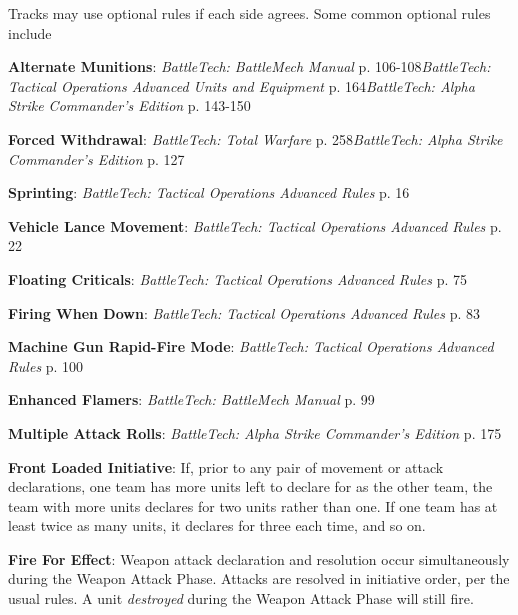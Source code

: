 Tracks may use optional rules if each side agrees.
Some common optional rules include

\begin{description}

  \item {\bfseries Alternate Munitions}: \emph{BattleTech: BattleMech Manual} p. 106-108\emph{BattleTech: Tactical Operations Advanced Units and Equipment} p. 164\emph{BattleTech: Alpha Strike Commander's Edition} p. 143-150

  \item {\bfseries Forced Withdrawal}: \emph{BattleTech: Total Warfare} p. 258\emph{BattleTech: Alpha Strike Commander's Edition} p. 127

  \item {\bfseries Sprinting}: \emph{BattleTech: Tactical Operations Advanced Rules} p. 16

  \item {\bfseries Vehicle Lance Movement}: \emph{BattleTech: Tactical Operations Advanced Rules} p. 22

  \item {\bfseries Floating Criticals}: \emph{BattleTech: Tactical Operations Advanced Rules} p. 75

  \item {\bfseries Firing When Down}: \emph{BattleTech: Tactical Operations Advanced Rules} p. 83

  \item {\bfseries Machine Gun Rapid-Fire Mode}: \emph{BattleTech: Tactical Operations Advanced Rules} p. 100

  \item {\bfseries Enhanced Flamers}: \emph{BattleTech: BattleMech Manual} p. 99

  \item {\bfseries Multiple Attack Rolls}: \emph{BattleTech: Alpha Strike Commander's Edition} p. 175

  \item {\bfseries Front Loaded Initiative}: If, prior to any pair of movement or attack declarations, one team has more units left to declare for as the other team, the team with more units declares for two units rather than one.
    If one team has at least twice as many units, it declares for three each time, and so on.

  \item {\bfseries Fire For Effect}: Weapon attack declaration and resolution occur simultaneously during the Weapon Attack Phase.
    Attacks are resolved in initiative order, per the usual rules.
    A unit \emph{destroyed} during the Weapon Attack Phase will still fire.

\end{description}
